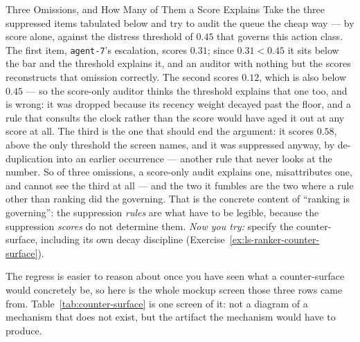 \documentclass[11pt,a4paper]{article}
\theoremstyle{definition}
\theoremstyle{plain}
\begin{document}
\begin{pdexample}{Three Omissions, and How Many of Them a Score Explains}
\setlength{\parskip}{4pt plus 1pt}
Take the three suppressed items tabulated below and try to audit the queue the cheap way --- by score alone, against the distress threshold of $0.45$ that governs this action class.
The first item, \texttt{agent-7}'s escalation, scores $0.31$; since $0.31<0.45$ it sits below the bar and the threshold explains it, and an auditor with nothing but the scores reconstructs that omission correctly.
The second scores $0.12$, which is also below $0.45$ --- so the score-only auditor thinks the threshold explains that one too, and is wrong: it was dropped because its recency weight decayed past the floor, and a rule that consults the clock rather than the score would have aged it out at any score at all.
The third is the one that should end the argument: it scores $0.58$, above the only threshold the screen names, and it was suppressed anyway, by de-duplication into an earlier occurrence --- another rule that never looks at the number.
So of three omissions, a score-only audit explains one, misattributes one, and cannot see the third at all --- and the two it fumbles are the two where a rule other than ranking did the governing. That is the concrete content of ``ranking is governing'': the suppression \emph{rules} are what have to be legible, because the suppression \emph{scores} do not determine them.
\emph{Now you try:} specify the counter-surface, including its own decay discipline (Exercise~\ref{ex:ls-ranker-counter-surface}).
\end{pdexample}
The regress is easier to reason about once you have seen what a counter-surface would
concretely be, so here is the whole mockup screen those three rows came from.
Table~\ref{tab:counter-surface} is one screen of it: not a diagram of a mechanism
that does not exist, but the artifact the mechanism would have to produce.
\end{document}
